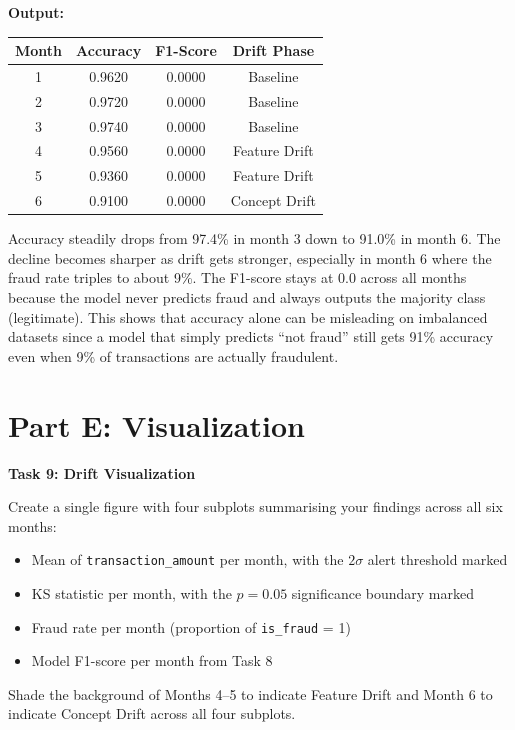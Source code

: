 \documentclass[12pt,a4paper]{article}
\begin{document}
\vspace{6pt}

\textbf{Output:}

\begin{center}
\renewcommand{\arraystretch}{1.4}
\begin{tabular}{cccc}
\toprule
\textbf{Month} & \textbf{Accuracy} & \textbf{F1-Score} & \textbf{Drift Phase} \\
\midrule
1 & 0.9620 & 0.0000 & Baseline \\
2 & 0.9720 & 0.0000 & Baseline \\
3 & 0.9740 & 0.0000 & Baseline \\
4 & 0.9560 & 0.0000 & Feature Drift \\
5 & 0.9360 & 0.0000 & Feature Drift \\
6 & 0.9100 & 0.0000 & Concept Drift \\
\bottomrule
\end{tabular}
\renewcommand{\arraystretch}{1.0}
\end{center}

\vspace{4pt}
Accuracy steadily drops from 97.4\% in month 3 down to 91.0\% in month 6. The decline becomes sharper as drift gets stronger, especially in month 6 where the fraud rate triples to about 9\%. The F1-score stays at 0.0 across all months because the model never predicts fraud and always outputs the majority class (legitimate). This shows that accuracy alone can be misleading on imbalanced datasets since a model that simply predicts ``not fraud'' still gets 91\% accuracy even when 9\% of transactions are actually fraudulent.

\vspace{24pt}


\section*{Part E: Visualization}

\begin{tcolorbox}
\textbf{Task 9: Drift Visualization}

Create a single figure with four subplots summarising your findings across all six months:

\begin{itemize}
\item Mean of \texttt{transaction\_amount} per month, with the $2\sigma$ alert threshold marked
\item KS statistic per month, with the $p = 0.05$ significance boundary marked
\item Fraud rate per month (proportion of \texttt{is\_fraud} = 1)
\item Model F1-score per month from Task 8
\end{itemize}

Shade the background of Months 4--5 to indicate Feature Drift and Month 6 to indicate Concept Drift across all four subplots.
\end{tcolorbox}
\end{document}
